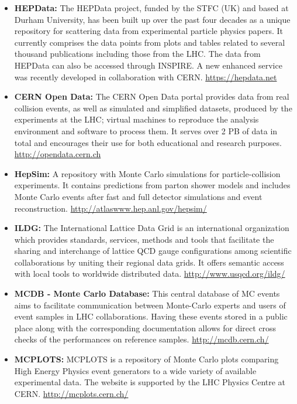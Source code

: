 \begin{itemize}
\item
  \textbf{HEPData:} The HEPData project, funded by the STFC (UK) and
  based at Durham University, has been built up over the past four
  decades as a unique repository for scattering data from experimental
  particle physics papers. It currently comprises the data points from
  plots and tables related to several thousand publications including
  those from the LHC. The data from HEPData can also be accessed through
  INSPIRE. A new enhanced service was recently developed in
  collaboration with CERN. \url{https://hepdata.net}
\item
  \textbf{CERN Open Data:} The CERN Open Data portal provides data from
  real collision events, as well as simulated and simplified datasets,
  produced by the experiments at the LHC; virtual machines to reproduce
  the analysis environment and software to process them. It serves over
  2 PB of data in total and encourages their use for both educational
  and research purposes. \url{http://opendata.cern.ch}
\item
  \textbf{HepSim:} A repository with Monte Carlo simulations for
  particle-collision experiments. It contains predictions from parton
  shower models and includes Monte Carlo events after fast and full
  detector simulations and event reconstruction.
  \url{http://atlaswww.hep.anl.gov/hepsim/}
\item
  \textbf{ILDG:} The International Lattice Data Grid is an international
  organization which provides standards, services, methods and tools
  that facilitate the sharing and interchange of lattice QCD gauge
  configurations among scientific collaborations by uniting their
  regional data grids. It offers semantic access with local tools to
  worldwide distributed data. \url{http://www.usqcd.org/ildg/}
\item
  \textbf{MCDB - Monte Carlo Database:} This central database of MC
  events aims to facilitate communication between Monte-Carlo experts
  and users of event samples in LHC collaborations. Having these events
  stored in a public place along with the corresponding documentation
  allows for direct cross checks of the performances on reference
  samples. \url{http://mcdb.cern.ch/}
\item
  \textbf{MCPLOTS:} MCPLOTS is a repository of Monte Carlo plots
  comparing High Energy Physics event generators to a wide variety of
  available experimental data. The website is supported by the LHC
  Physics Centre at CERN. \url{http://mcplots.cern.ch/}
\end{itemize}

